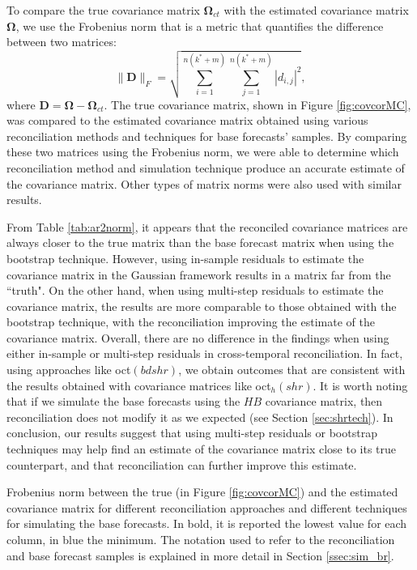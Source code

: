 \documentclass[a4paper,11pt]{article}
\newcommand{\Dvet}{\bm{D}}
\newcommand{\Omegavet}{\bm{\Omega}}
\theoremstyle{definition}
\begin{document}
To compare the true covariance matrix $\Omegavet_{ct}$ with the estimated covariance matrix $\Omegavet$, we use the Frobenius norm that is a metric that quantifies the difference between two matrices:
$$
\lVert \Dvet \rVert_F = \sqrt{\sum_{i = 1}^{n(k^\ast + m)}\sum_{j = 1}^{n(k^\ast + m)}|d_{i,j}|^2},
$$
where $\Dvet = \Omegavet - \Omegavet_{ct}$. The true covariance matrix, shown in Figure \ref{fig:covcorMC}, was compared to the estimated covariance matrix obtained using various reconciliation methods and techniques for base forecasts' samples. By comparing these two matrices using the Frobenius norm, we were able to determine which reconciliation method and simulation technique produce an accurate estimate of the covariance matrix. Other types of matrix norms were also used with similar results.

From Table \ref{tab:ar2norm}, it appears that the reconciled covariance matrices are always closer to the true matrix than the base forecast matrix when using the bootstrap technique. However, using in-sample residuals to estimate the covariance matrix in the Gaussian framework results in a matrix far from the “truth". On the other hand, when using multi-step residuals to estimate the covariance matrix, the results are more comparable to those obtained with the bootstrap technique, with the reconciliation improving the estimate of the covariance matrix. Overall, there are no difference in the findings when using either in-sample or multi-step residuals in cross-temporal reconciliation. In fact, using approaches like oct$(bdshr)$, we obtain outcomes that are consistent with the results obtained with covariance matrices like oct$_h(shr)$. It is worth noting that if we simulate the base forecasts using the $HB$ covariance matrix, then reconciliation does not modify it as we expected (see Section \ref{sec:shrtech}). In conclusion, our results suggest that using multi-step residuals or bootstrap techniques may help find an estimate of the covariance matrix close to its true counterpart, and that reconciliation can further improve this estimate.

\begin{table}[t]
\centering
\fontsize{9}{11}\selectfont

\caption{Frobenius norm between the true (in Figure \ref{fig:covcorMC}) and the estimated covariance matrix for different reconciliation approaches and different techniques for simulating the base forecasts. In bold, it is reported the lowest value for each column, in blue the minimum.  The notation used to refer to the reconciliation and base forecast samples is explained in more detail in Section \ref{ssec:sim_br}.}
\label{tab:ar2norm}
\end{table}
\end{document}
